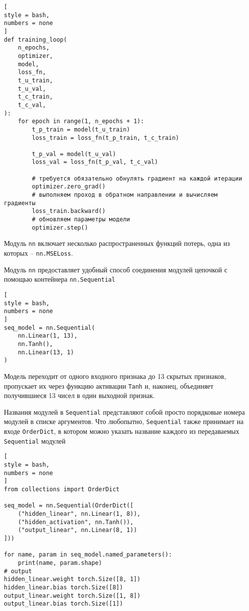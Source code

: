 \documentclass[%
	11pt,
	a4paper,
	utf8,
		]{article}
\begin{document}
\begin{lstlisting}[
style = bash,
numbers = none
]
def training_loop(
    n_epochs,
    optimizer,
    model,
    loss_fn,
    t_u_train,
    t_u_val,
    t_c_train,
    t_c_val,
):
    for epoch in range(1, n_epochs + 1):
        t_p_train = model(t_u_train)
        loss_train = loss_fn(t_p_train, t_c_train)
        
        t_p_val = model(t_u_val)
        loss_val = loss_fn(t_p_val, t_c_val)
        
        # требуется обязательно обнулять градиент на каждой итерации
        optimizer.zero_grad() 
        # выполняем проход в обратном направлении и вычисляем градиенты
        loss_train.backward()
        # обновляем параметры модели
        optimizer.step()
\end{lstlisting}

Модуль \verb|nn| включает несколько распространенных функций потерь, одна из которых -- \verb|nn.MSELoss|.

Модуль \verb|nn| предоставляет удобный способ соединения модулей цепочкой с помощью контейнера \verb|nn.Sequential|
\begin{lstlisting}[
style = bash,
numbers = none
]
seq_model = nn.Sequential(
    nn.Linear(1, 13),
    nn.Tanh(),
    nn.Linear(13, 1)
)
\end{lstlisting}

Модель переходит от одного входного признака до 13 скрытых признаков, пропускает их через функцию активации \verb|Tanh| и, наконец, объединяет получившиеся 13 чисел в один выходной признак.

Названия модулей в \verb|Sequential| представляют собой просто порядковые номера модулей в списке аргументов. Что любопытно, \verb|Sequential| также принимает на входе \verb|OrderDict|, в котором можно указать название каждого из передаваемых \verb|Sequential| модулей
\begin{lstlisting}[
style = bash,
numbers = none
]
from collections import OrderDict

seq_model = nn.Sequential(OrderDict([
    ("hidden_linear", nn.Linear(1, 8)),
    ("hidden_activation", nn.Tanh()),
    ("output_linear", nn.Linear(8, 1))
]))

for name, param in seq_model.named_parameters():
    print(name, param.shape)
# output
hidden_linear.weight torch.Size([8, 1])
hidden_linear.bias torch.Size([8])
output_linear.weight torch.Size([1, 8])
output_linear.bias torch.Size([1])
\end{lstlisting}
\end{document}
